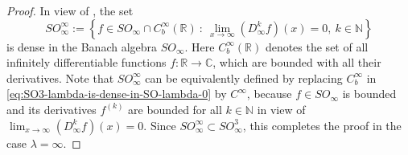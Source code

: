 \documentclass{birkjour}
\numberwithin{equation}{section}
\newcommand{\C}{\mathbb{C}}
\newcommand{\N}{\mathbb{N}}
\newcommand{\R}{\mathbb{R}}
\begin{document}
\begin{proof}
In view of \cite[Lemma~2.3]{BBK04}, the set
\begin{equation}\label{eq:SO3-lambda-is-dense-in-SO-lambda-0}
SO_\infty^\infty:=
\left\{f\in SO_\infty\cap C_b^\infty(\R)\ :\
\lim_{x\to\infty}(D_\infty^kf)(x)=0,\ k\in\N
\right\}
\end{equation}
is dense in the Banach algebra $SO_\infty$. Here $C_b^\infty(\R)$ denotes the
set of all infinitely differentiable functions $f:\R\to\C$, which are bounded
with all their derivatives. Note that $SO_\infty^\infty$ can be
equivalently defined by replacing $C_b^\infty$ in
\eqref{eq:SO3-lambda-is-dense-in-SO-lambda-0} by $C^\infty$,
because $f\in SO_\infty$ is bounded and its derivatives $f^{(k)}$ are bounded
for all $k\in\N$ in view of $\lim_{x\to\infty}(D_\infty^kf)(x)=0$.
Since $SO_\infty^\infty\subset SO_\infty^3$, this completes the proof in the
case $\lambda=\infty$.


\end{proof}
\end{document}
